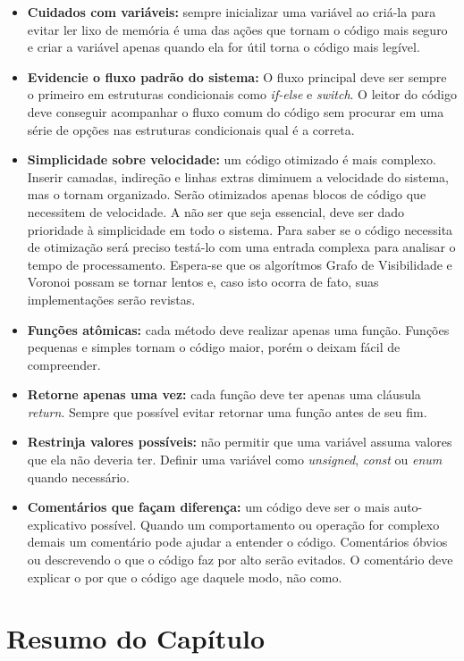 \begin{itemize}
  \item \textbf{Cuidados com variáveis:} sempre inicializar uma variável ao criá-la para evitar ler lixo de memória é uma das ações que tornam o código mais seguro e criar a variável apenas quando ela for útil torna o código mais legível.
  \item \textbf{Evidencie o fluxo padrão do sistema:} O fluxo principal deve ser sempre o primeiro em estruturas condicionais como \textit{if-else} e \textit{switch}. O leitor do código deve conseguir acompanhar o fluxo comum do código sem procurar em uma série de opções nas estruturas condicionais qual é a correta.
  \item \textbf{Simplicidade sobre velocidade:} um código otimizado é mais complexo. Inserir camadas, indireção e linhas extras diminuem a velocidade do sistema, mas o tornam organizado. Serão otimizados apenas blocos de código que necessitem de velocidade. A não ser que seja essencial, deve ser dado prioridade à simplicidade em todo o sistema. Para saber se o código necessita de otimização será preciso testá-lo com uma entrada complexa para analisar o tempo de processamento. Espera-se que os algorítmos Grafo de Visibilidade e Voronoi possam se tornar lentos e, caso isto ocorra de fato, suas implementações serão revistas.
  \item \textbf{Funções atômicas:} cada método deve realizar apenas uma função. Funções pequenas e simples tornam o código maior, porém o deixam fácil de compreender.
  \item \textbf{Retorne apenas uma vez:} cada função deve ter apenas uma cláusula \textit{return}. Sempre que possível evitar retornar uma função antes de seu fim.
  \item \textbf{Restrinja valores possíveis:} não permitir que uma variável assuma valores que ela não deveria ter. Definir uma variável como \textit{unsigned}, \textit{const} ou \textit{enum} quando necessário.
  \item \textbf{Comentários que façam diferença:} um código deve ser o mais auto-explicativo possível. Quando um comportamento ou operação for complexo demais um comentário pode ajudar a entender o código. Comentários óbvios ou descrevendo o que o código faz por alto serão evitados. O comentário deve explicar o por que o código age daquele modo, não como.
\end{itemize} 

\section{Resumo do Capítulo}

